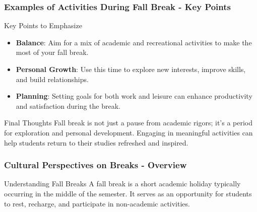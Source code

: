 \documentclass[aspectratio=169]{beamer}
\begin{document}
\begin{frame}[fragile]
    \frametitle{Examples of Activities During Fall Break - Key Points}
    \begin{block}{Key Points to Emphasize}
        \begin{itemize}
            \item \textbf{Balance}: Aim for a mix of academic and recreational activities to make the most of your fall break.
            \item \textbf{Personal Growth}: Use this time to explore new interests, improve skills, and build relationships.
            \item \textbf{Planning}: Setting goals for both work and leisure can enhance productivity and satisfaction during the break.
        \end{itemize}
    \end{block}

    \begin{block}{Final Thoughts}
        Fall break is not just a pause from academic rigors; it’s a period for exploration and personal development. Engaging in meaningful activities can help students return to their studies refreshed and inspired.
    \end{block}
\end{frame}

\begin{frame}[fragile]
    \frametitle{Cultural Perspectives on Breaks - Overview}
    \begin{block}{Understanding Fall Breaks}
        A fall break is a short academic holiday typically occurring in the middle of the semester. It serves as an opportunity for students to rest, recharge, and participate in non-academic activities.
    \end{block}
\end{frame}
\end{document}
